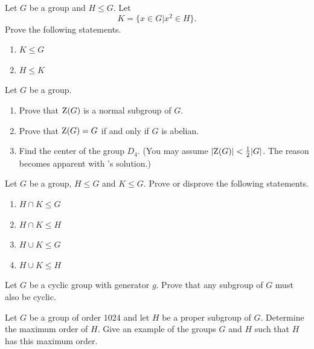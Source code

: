 \begin{problem}
    Let $G$ be a group and $H \leq G$. Let
    \[
        K = \{x \in G \vert x^2 \in H\}.
    \]
    Prove the following statements.
    \begin{enumerate}[label=(\alph*)]
        \item $K \leq G$
        \item $H \leq K$
    \end{enumerate}
\end{problem}

\begin{problem}\label{problem-center-of-G}
    Let $G$ be a group.
    \begin{enumerate}[label=(\alph*)]
        \item Prove that $\mathrm{Z}(G)$ is a normal subgroup of $G$.
        \item Prove that $\mathrm{Z}(G) = G$ if and only if $G$ is abelian.
        \item Find the center of the group $D_4$.\newline
        (You may assume $|\mathrm{Z}(G)| < \frac12 |G|$. The reason becomes apparent with 's solution.)
    \end{enumerate}
\end{problem}

\newpage

\begin{problem}\label{problem-intersection-of-subgroups}
    Let $G$ be a group, $H \leq G$ and $K \leq G$. Prove or disprove the following statements.
    \begin{enumerate}[label=(\alph*)]
        \item $H \cap K \leq G$
        \item $H \cap K \leq H$
        \item $H \cup K \leq G$
        \item $H \cup K \leq H$
    \end{enumerate}
\end{problem}

\begin{problem}\label{problem-subgroup-of-cyclic-group-is-cyclic}
    Let $G$ be a cyclic group with generator $g$. Prove that any subgroup of $G$ must also be cyclic.
\end{problem}

\begin{problem}
    Let $G$ be a group of order 1024 and let $H$ be a proper subgroup of $G$. Determine the maximum order of $H$. Give an example of the groups $G$ and $H$ such that $H$ has this maximum order.
\end{problem}

